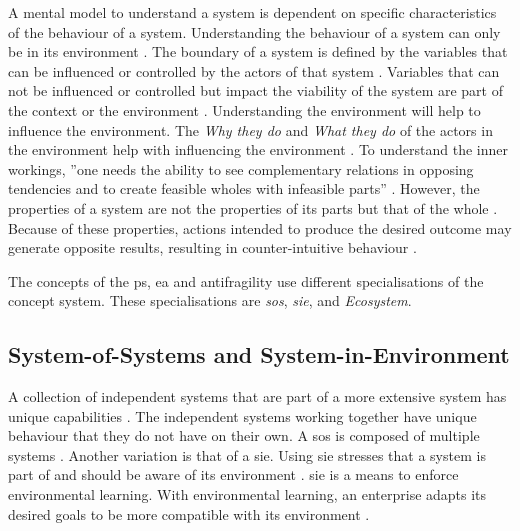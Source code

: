 A mental model to understand a system is dependent on specific characteristics of the behaviour of a system. Understanding the behaviour of a system can only be in its environment \parencite[p.~29]{Gharajedaghi2011}. The boundary of a system is defined by the variables that can be influenced or controlled by the actors of that system \parencite[p.~182]{Gharajedaghi2011}. Variables that can not be influenced or controlled but impact the viability of the system are part of the context \parencite[p.~183]{Gharajedaghi2011} or the environment \parencite[p.~13--14]{Mannaert2016}. Understanding the environment will help to influence the environment. The \textit{Why they do} and \textit{What they do} of the actors in the environment help with influencing the environment \parencite[p.~33]{Gharajedaghi2011}. To understand the inner workings, ''one needs the ability to see complementary relations in opposing tendencies and to create feasible wholes with infeasible parts'' \parencite[p.~38]{Gharajedaghi2011}. However, the properties of a system are not the properties of its parts but that of the whole \parencites{Ackoff1973}{Gharajedaghi2011}. Because of these properties, actions intended to produce the desired outcome may generate opposite results, resulting in counter-intuitive behaviour \parencite[p.~48]{Gharajedaghi2011}.

The concepts of the \gls{ps}, \acrshort{ea} and \gls{antifragility} use different \glspl{specialisation} of the concept system. These \glspl{specialisation} are \textit{\gls{sos}}, \textit{\gls{sie}}, and \textit{Ecosystem}.
\subsection{System-of-Systems and System-in-Environment}
\label{sub:tbsysofsys}
A collection of independent systems that are part of a more extensive system has unique capabilities \parencite{INCOSE2018}. The independent systems working together have unique behaviour that they do not have on their own.  A \gls{sos} is composed of multiple systems \parencites{Ackoff1973}{Gharajedaghi2011}. Another variation is that of a \acrlong{sie}. Using \gls{sie} stresses that a system is part of and should be aware of its environment \parencites{Gharajedaghi2011}{Lapalme2012}{Korhonen2016}{Mannaert2016}. \gls{sie} is a means to enforce environmental learning. With environmental learning, an enterprise adapts its desired goals to be more compatible with its environment \parencite[p.~41]{Lapalme2012}.
